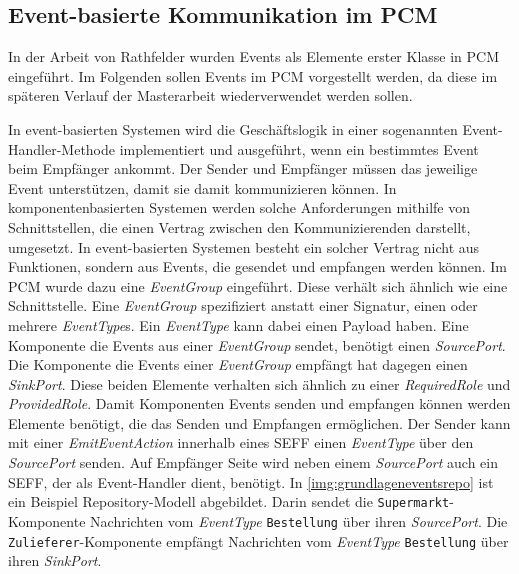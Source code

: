\subsection{Event-basierte Kommunikation im PCM}
In der Arbeit von Rathfelder \cite{Rathfelder2013} wurden Events als Elemente erster Klasse in PCM eingeführt. Im Folgenden sollen Events im PCM vorgestellt werden, da diese im späteren Verlauf der Masterarbeit wiederverwendet werden sollen. \par
In event-basierten Systemen wird die Geschäftslogik in einer sogenannten Event-Handler-Methode implementiert und ausgeführt, wenn ein bestimmtes Event beim Empfänger ankommt. Der Sender und Empfänger müssen das jeweilige Event unterstützen, damit sie damit kommunizieren können. In komponentenbasierten Systemen werden solche Anforderungen mithilfe von Schnittstellen, die einen Vertrag zwischen den Kommunizierenden darstellt, umgesetzt. In event-basierten Systemen besteht ein solcher Vertrag nicht aus Funktionen, sondern aus Events, die gesendet und empfangen werden können. Im PCM wurde dazu eine \emph{EventGroup} eingeführt. Diese verhält sich ähnlich wie eine Schnittstelle. Eine \emph{EventGroup} spezifiziert anstatt einer Signatur, einen oder mehrere \emph{EventType}s. Ein \emph{EventType} kann dabei einen Payload haben. Eine Komponente die Events aus einer \emph{EventGroup} sendet, benötigt einen \emph{SourcePort}. Die Komponente die Events einer \emph{EventGroup} empfängt hat dagegen einen \emph{SinkPort}. Diese beiden Elemente verhalten sich ähnlich zu einer \emph{RequiredRole} und \emph{ProvidedRole}. 
Damit Komponenten Events senden und empfangen können werden Elemente benötigt, die das Senden und Empfangen ermöglichen. Der Sender kann mit einer \emph{EmitEventAction} innerhalb eines SEFF einen \emph{EventType} über den \emph{SourcePort} senden. Auf Empfänger Seite wird neben einem \emph{SourcePort} auch ein SEFF, der als Event-Handler dient, benötigt. In \autoref{img:grundlageneventsrepo} ist ein Beispiel Repository-Modell abgebildet. Darin sendet die \texttt{Supermarkt}-Komponente Nachrichten vom \emph{EventType} \texttt{Bestellung} über ihren \emph{SourcePort}. Die \texttt{Zulieferer}-Komponente empfängt Nachrichten vom \emph{EventType} \texttt{Bestellung} über ihren \emph{SinkPort}.

